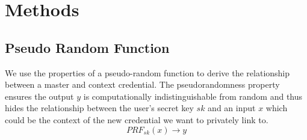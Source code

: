 






















































\section{Methods}



\subsection{Pseudo Random Function}
We use the properties of a pseudo-random function to derive the relationship between a master and context credential. The pseudorandomness property ensures the output $y$ is computationally indistinguishable from random and thus hides the relationship between the user's secret key $sk$ and an input $x$ which could be the context of the new credential we want to privately link to.
\[
    PRF_{sk}(x) \to y
\]

